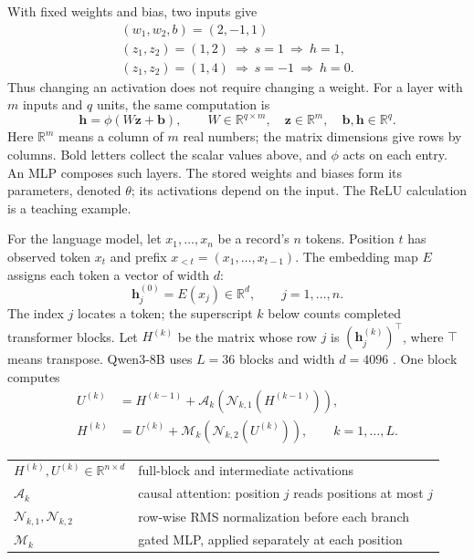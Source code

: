 \documentclass[12pt]{report}
\begin{document}
\noindent With fixed weights and bias, two inputs give
\[
\begin{array}{c}
(w_1,w_2,b)=(2,-1,1)\\[2pt]
(z_1,z_2)=(1,2)\ \Longrightarrow\ s=1\ \Longrightarrow\ h=1,\\
(z_1,z_2)=(1,4)\ \Longrightarrow\ s=-1\ \Longrightarrow\ h=0.
\end{array}
\]
Thus changing an activation does not require changing a weight.
For a layer with $m$ inputs and $q$ units, the same computation is
\begin{equation}
\mathbf h=\phi(W\mathbf z+\mathbf b),\qquad
W\in\mathbb R^{q\times m},\quad
\mathbf z\in\mathbb R^m,\quad \mathbf b,\mathbf h\in\mathbb R^q.
\label{eq:lm-dense-layer}
\end{equation}
Here $\mathbb R^m$ means a column of $m$ real numbers; the matrix dimensions
give rows by columns. Bold letters collect the scalar values above, and
$\phi$ acts on each entry. An MLP composes such layers. The stored weights
and biases form its parameters, denoted $\theta$; its activations depend
on the input. The ReLU calculation is a teaching example.

For the language model, let $x_1,\ldots,x_n$ be a record's $n$ tokens.
Position $t$ has observed token $x_t$ and prefix $x_{<t}=(x_1,\ldots,x_{t-1})$.
The embedding map $E$ assigns each token a vector of width $d$:
\[
\mathbf h_j^{(0)}=E(x_j)\in\mathbb R^d,\qquad j=1,\ldots,n.
\]
The index $j$ locates a token; the superscript $k$ below counts completed
transformer blocks. Let $H^{(k)}$ be the matrix whose row $j$ is
$(\mathbf h_j^{(k)})^\top$, where $\top$ means transpose.
Qwen3-8B uses $L=36$ blocks and width $d=4096$ \cite{qwen3,qwen3config}.
One block computes
\begin{equation}
\begin{aligned}
U^{(k)}
 &=H^{(k-1)}+\mathcal A_k\!\left(\mathcal N_{k,1}(H^{(k-1)})\right),\\
H^{(k)}
 &=U^{(k)}+\mathcal M_k\!\left(\mathcal N_{k,2}(U^{(k)})\right),
 \qquad k=1,\ldots,L.
\end{aligned}
\label{eq:lm-block}
\end{equation}
\noindent
\begin{tabular}{@{}ll@{}}
$H^{(k)},U^{(k)}\in\mathbb R^{n\times d}$ & full-block and intermediate activations \\
$\mathcal A_k$ & causal attention: position $j$ reads positions at most $j$ \\
$\mathcal N_{k,1},\mathcal N_{k,2}$ & row-wise RMS normalization before each branch \\
$\mathcal M_k$ & gated MLP, applied separately at each position
\end{tabular}
\end{document}

